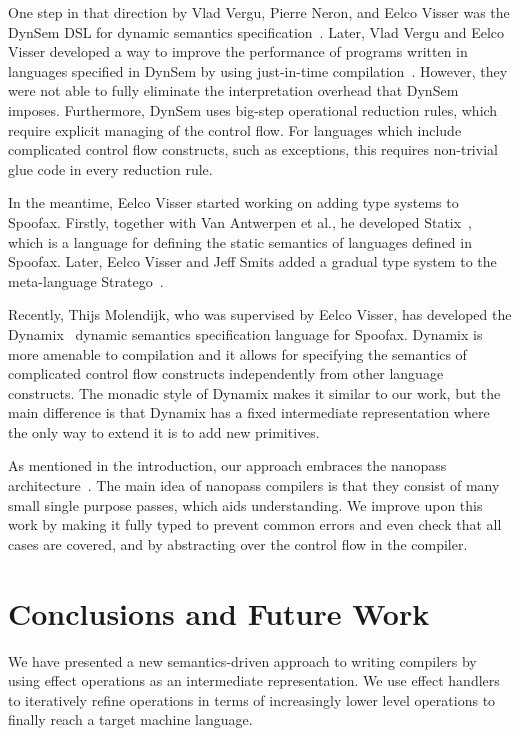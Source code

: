 \documentclass[a4paper,UKenglish,cleveref, autoref, thm-restate]{oasics-v2021}
\begin{document}
One step in that direction by Vlad Vergu, Pierre Neron, and Eelco Visser was the DynSem DSL for dynamic semantics specification~\cite{vergu_et_al:LIPIcs:2015:5208}.
Later, Vlad Vergu and Eelco Visser developed a way to improve the performance of programs written in languages specified in DynSem by using just-in-time compilation~\cite{10.1145/3237009.3237018}.
However, they were not able to fully eliminate the interpretation overhead that DynSem imposes.
Furthermore, DynSem uses big-step operational reduction rules, which require explicit managing of the control flow.
For languages which include complicated control flow constructs, such as exceptions, this requires non-trivial glue code in every reduction rule.

In the meantime, Eelco Visser started working on adding type systems to Spoofax.
Firstly, together with Van Antwerpen et al., he developed Statix~\cite{10.1145/3276484}, which is a language for defining the static semantics of languages defined in Spoofax.
Later, Eelco Visser and Jeff Smits added a gradual type system to the meta-language Stratego~\cite{10.1145/3426425.3426928}.

Recently, Thijs Molendijk, who was supervised by Eelco Visser, has developed the Dynamix~\cite{dynamix} dynamic semantics specification language for Spoofax.
Dynamix is more amenable to compilation and it allows for specifying the semantics of complicated control flow constructs independently from other language constructs.
The monadic style of Dynamix makes it similar to our work, but the main difference is that Dynamix has a fixed intermediate representation where the only way to extend it is to add new primitives.

As mentioned in the introduction, our approach embraces the nanopass architecture~\cite{10.1145/1016850.1016878, 10.1145/2544174.2500618}.
The main idea of nanopass compilers is that they consist of many small single purpose passes, which aids understanding.
We improve upon this work by making it fully typed to prevent common errors and even check that all cases are covered, and by abstracting over the control flow in the compiler.

\section{Conclusions and Future Work}\label{sec:conclusion}

We have presented a new semantics-driven approach to writing compilers by using effect operations as an intermediate representation.
We use effect handlers to iteratively refine operations in terms of increasingly lower level operations to finally reach a target machine language.
\end{document}
